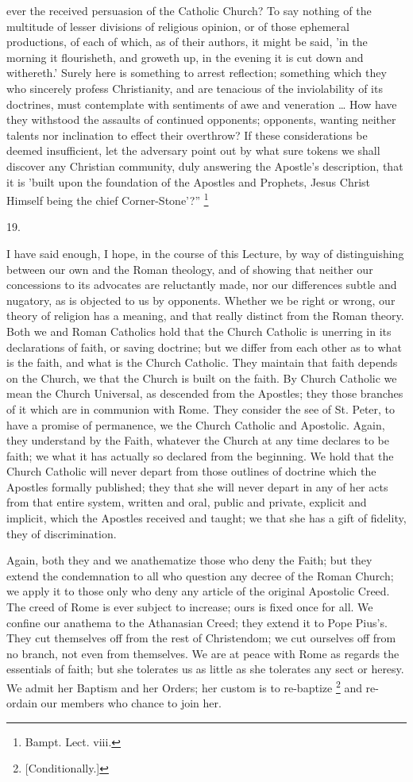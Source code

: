 ever the received persuasion of the Catholic Church? To say nothing of
the multitude of lesser divisions of religious opinion, or of those
ephemeral productions, of each of which, as of their authors, it might
be said, 'in the morning it flourisheth, and groweth up, in the
evening it is cut down and withereth.' Surely here is something to
arrest reflection; something which they who sincerely profess
Christianity, and are tenacious of the inviolability of its doctrines,
must contemplate with sentiments of awe and veneration … How have
they withstood the assaults of continued opponents; opponents, wanting
neither talents nor inclination to effect their overthrow? If these
considerations be deemed insufficient, let the adversary point out by
what sure tokens we shall discover any Christian community, duly
answering the Apostle's description, that it is 'built upon the
foundation of the Apostles and Prophets, Jesus Christ Himself being
the chief Corner-Stone'?'' \footnote{Bampt. Lect. viii.}

19.

I have said enough, I hope, in the course of this Lecture, by way
of distinguishing between our own and the Roman theology, and of
showing that neither our concessions to its advocates are reluctantly
made, nor our differences subtle and nugatory, as is objected to
us by opponents. Whether we be right or wrong, our theory of religion
has a meaning, and that really distinct from the Roman theory. Both we
and Roman Catholics hold that the Church Catholic is unerring in its
declarations of faith, or saving doctrine; but we differ from each
other as to what is the faith, and what is the Church Catholic. They
maintain that faith depends on the Church, we that the Church is built
on the faith. By Church Catholic we mean the Church Universal, as
descended from the Apostles; they those branches of it which are in
communion with Rome. They consider the see of St. Peter, to have a
promise of permanence, we the Church Catholic and Apostolic. Again,
they understand by the Faith, whatever the Church at any time declares
to be faith; we what it has actually so declared from the beginning.
We hold that the Church Catholic will never depart from those outlines
of doctrine which the Apostles formally published; they that she will
never depart in any of her acts from that entire system, written and
oral, public and private, explicit and implicit, which the Apostles
received and taught; we that she has a gift of fidelity, they of
discrimination.

Again, both they and we anathematize those who deny the Faith; but
they extend the condemnation to all who question any decree of the
Roman Church; we apply it to those only who deny any article of the
original Apostolic Creed. The creed of Rome is ever subject to
increase; ours is fixed once for all. We confine our anathema to the
Athanasian Creed; they extend it to Pope Pius's. They cut themselves
off from the rest of Christendom; we cut ourselves off from no branch,
not even from themselves. We are at peace with Rome as regards the
essentials of faith; but she tolerates us as little as she tolerates
any sect or heresy. We admit her Baptism and her Orders; her custom is to re-baptize \footnote{[Conditionally.]}
and re-ordain our members who chance to join her.

